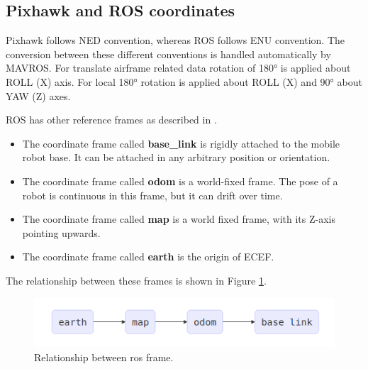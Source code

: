 \subsection{Pixhawk and ROS coordinates}

Pixhawk follows NED convention, whereas ROS follows ENU convention. The conversion between these different conventions is handled automatically by MAVROS. For translate airframe related data rotation of 180° is applied about ROLL (X) axis. For local 180° rotation is applied about ROLL (X) and 90° about YAW (Z) axes.

ROS has other reference frames as described in .

\begin{itemize}
	\item The coordinate frame called \textbf{base\_link} is rigidly attached to the mobile robot base. It can be attached in any arbitrary position or orientation.
	\item The coordinate frame called \textbf{odom} is a world-fixed frame. The pose of a robot is continuous in this frame, but it can drift over time.
	\item The coordinate frame called \textbf{map} is a world fixed frame, with its Z-axis pointing upwards. 
	\item The coordinate frame called \textbf{earth} is the origin of ECEF.
\end{itemize}

The relationship between these frames is shown in Figure \ref{fig:rosrefframes}.

\begin{figure}
	\centering
	\includegraphics[width=5in]{figures/ros_rel_frames}
	\caption[FAV of Antonomous Driving System.]{\small 
	Relationship between ros frame.  }
	\label{fig:rosrefframes}
\end{figure}

\FloatBarrier

